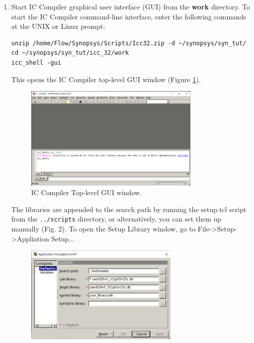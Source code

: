 \documentclass[a4paper,12pt,twoside]{article}
\begin{document}
\begin{enumerate}
    \item Start IC Compiler graphical user interface (GUI) from the \textbf{work} directory. To start the IC Compiler command-line interface, enter the following commands at the UNIX or Linux prompt:
    \begin{verbatim}
unzip /home/Flow/Synopsys/Scripts/Icc32.zip -d ~/synopsys/syn_tut/
cd ~/synopsys/syn_tut/icc_32/work
icc_shell -gui
    \end{verbatim}
    This opens the IC Compiler top-level GUI window (Figure \ref{f3}).
    \begin{figure}[H]
        \centering
        \includegraphics[width=0.8\textwidth]{images/3.png}
        \caption{IC Compiler Top-level GUI window.}
        \label{f3}
    \end{figure}
    The libraries are appended to the search path by running the setup.tcl script from the \texttt{../scripts} directory, or alternatively, you can set them up manually (Fig. 2). To open the Setup Library window, go to File->Setup->Appliation Setup...
    \begin{figure}[H]
        \centering
        \includegraphics[width=0.7\textwidth]{images/4.png}

\end{figure}
\end{enumerate}
\end{document}
